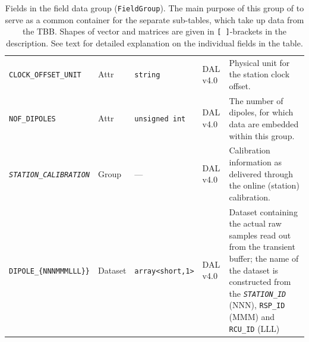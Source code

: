 \documentclass[a4paper,10pt,bibtotoc]{scrartcl}
\begin{document}
\begin{table}[htbp]
\begin{tabular}{|llllp{4.5cm}|}
    \small {\texttt{CLOCK\_OFFSET\_UNIT}} & Attr & \verb|string| & DAL v4.0 & Physical unit for the station clock offset. \\
    \small {\texttt{NOF\_DIPOLES}} & Attr & \verb|unsigned int| & DAL v4.0 & The number of dipoles, for which data are embedded within this group. \\
    \hline
    \small \textit{\texttt{STATION\_CALIBRATION}} & Group & --- & DAL v4.0 & Calibration information as delivered through the online (station) calibration. \\
    \small {\texttt{DIPOLE\_\{NNNMMMLLL\}\}}} & Dataset & \verb|array<short,1>| & DAL v4.0 & Dataset containing the actual raw samples read out from the transient buffer; the name of the dataset is constructed from the \small \textit{\texttt{STATION\_ID}} (NNN), \verb|RSP_ID| (MMM) and \verb|RCU_ID| (LLL) \\
  \end{tabular}
  \caption[Fields in the field data group (\texttt{FieldGroup}).]{
    Fields in the field data group (\texttt{FieldGroup}). The
    main purpose of this group of to serve as a common container for the separate
    sub-tables, which take up data from the TBB. Shapes of vector and matrices are given in
    \texttt{[ ]}-brackets in the description. See text for detailed explanation
    on the individual fields in the table.}
  \label{tab:field group}
\end{table}
\end{document}
